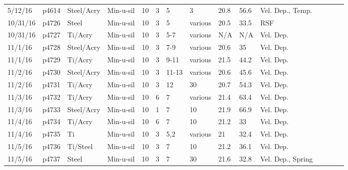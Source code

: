 \begin{landscape}
\begin{longtable} {lllllllllllllll}
5/12/16  & p4614      & Steel/Acry    & Min-u-sil    & 10           & 3         & 5             & 3                            & 20.8        & 56.6     & Vel. Dep., Temp.\\
10/31/16 &	p4726 &	Steel &	Min-u-sil &	10 &	3   &	5         &	various &	20.5 &	33.5 &	RSF\\
10/31/16 &	p4727 &	Ti/Acry &	Min-u-sil &	10 &	3 &	5-7       &	various &	N/A &	N/A &	Vel. Dep.\\
11/1/16 &	p4728 &	Steel/Acry &	Min-u-sil &	10    &	3 &	7-9   &	various &	20.6 &	35 &	Vel. Dep.\\
11/1/16 &	p4729 &	Ti/Acry &	Min-u-sil &	10 &	3   &	9-11      &	various &	21.5 &	44.2 &	Vel. Dep.\\
11/2/16 &	p4730 &	Steel/Acry &	Min-u-sil &	10    &	3 &	11-13 &	various &	20.6 &	45.6 &	Vel. Dep.\\
11/2/16 &	p4731 &	Ti/Acry &	Min-u-sil &	10 &	3   &	12    &	30          &	20.7 &	54.3 &	Vel. Dep.\\
11/3/16 &	p4732 &	Ti/Acry &	Min-u-sil &	10 &	6   &	7	    & various     &	21.4 &	63.4 &	Vel. Dep.\\
11/3/16 &	p4733 &	Steel/Acry &	Min-u-sil &	10    &	1 &	7 &	10          &	21.9 &	66.9 &	Vel. Dep.\\
11/4/16 &	p4734 &	Ti/Acry &	Min-u-sil &	10 &	6   &	7     &	10          &	21.2 &	33 &	Vel. Dep.\\
11/4/16 &	p4735 &	Ti &	Min-u-sil &	10 &	3       &	5,2   &	various     &	21 &	32.4 &	Vel. Dep.\\
11/5/16 &	p4736 &	Ti/Steel &	Min-u-sil &	10 &	3 &	7     &	10          &	21.2 &	36.1 &	Vel. Dep.\\
11/5/16 &	p4737 &	Steel &	Min-u-sil &	10 &	3     &	7     &	30          &	21.6 &	32.8 &	Vel. Dep., Spring\\
\end{longtable}
\end{landscape}